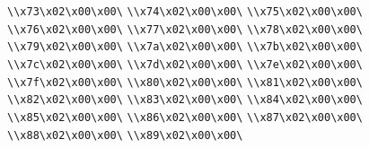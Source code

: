 \verb|\\x73\x02\x00\x00\|\newline
\verb|\\x74\x02\x00\x00\|\newline
\verb|\\x75\x02\x00\x00\|\newline
\verb|\\x76\x02\x00\x00\|\newline
\verb|\\x77\x02\x00\x00\|\newline
\verb|\\x78\x02\x00\x00\|\newline
\verb|\\x79\x02\x00\x00\|\newline
\verb|\\x7a\x02\x00\x00\|\newline
\verb|\\x7b\x02\x00\x00\|\newline
\verb|\\x7c\x02\x00\x00\|\newline
\verb|\\x7d\x02\x00\x00\|\newline
\verb|\\x7e\x02\x00\x00\|\newline
\verb|\\x7f\x02\x00\x00\|\newline
\verb|\\x80\x02\x00\x00\|\newline
\verb|\\x81\x02\x00\x00\|\newline
\verb|\\x82\x02\x00\x00\|\newline
\verb|\\x83\x02\x00\x00\|\newline
\verb|\\x84\x02\x00\x00\|\newline
\verb|\\x85\x02\x00\x00\|\newline
\verb|\\x86\x02\x00\x00\|\newline
\verb|\\x87\x02\x00\x00\|\newline
\verb|\\x88\x02\x00\x00\|\newline
\verb|\\x89\x02\x00\x00\|\newline

